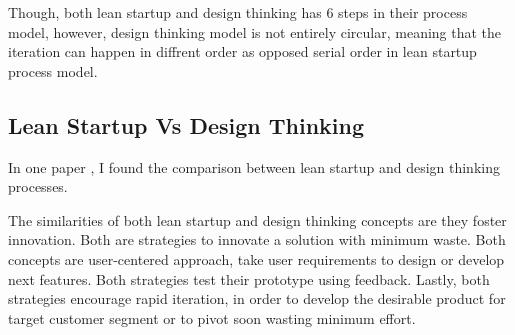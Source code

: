 Though, both lean startup and design thinking has 6 steps in their process model, however, design thinking model is not entirely circular, meaning that the iteration can happen in diffrent order as opposed serial order in lean startup process model.

\subsection{Lean Startup Vs Design Thinking}

In one paper \citep{leanvsdesign}, I found the comparison between lean startup and design thinking processes.

The similarities of both lean startup and design thinking concepts are they foster innovation. Both are strategies to innovate a solution with minimum waste. Both concepts are user-centered approach, take user requirements to design or develop next features. Both strategies test their prototype using feedback. Lastly, both strategies encourage rapid iteration, in order to develop the desirable product for target customer segment or to pivot soon wasting minimum effort.

